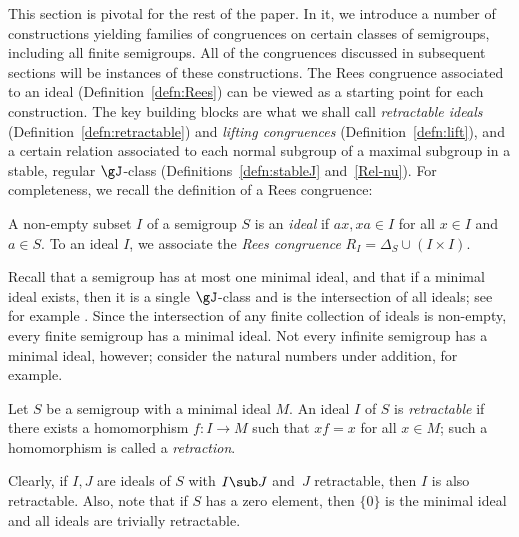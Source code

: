 This section is pivotal for the rest of the paper.  In it, we introduce a number of constructions yielding families of congruences on certain classes of semigroups, including all finite semigroups.
%
All of the congruences discussed in subsequent sections will be instances of these constructions.  The Rees congruence associated to an ideal (Definition~\ref{defn:Rees}) can be viewed as a starting point for each construction.  The key building blocks are what we shall call \emph{retractable ideals} (Definition~\ref{defn:retractable}) and \emph{lifting congruences} (Definition~\ref{defn:lift}), and a certain relation associated to each normal subgroup of a maximal subgroup in a stable, regular $\gJ$-class (Definitions~\ref{defn:stableJ} and~\ref{Rel-nu}).
%
%
For completeness, we recall the definition of a Rees congruence:

\begin{definition}\label{defn:Rees}
A non-empty subset $I$ of a semigroup $S$ is an \emph{ideal} if $ax,xa\in I$ for all $x\in I$ and $a\in S$.  To an ideal $I$, we associate the \emph{Rees congruence} $R_I=\Delta_S\cup(I\times I)$.
\end{definition}

Recall that a semigroup has at most one minimal ideal, and that if a minimal ideal exists, then it is a single $\gJ$-class and is the intersection of all ideals; see for example \cite[Section 3.1]{Howie}.  Since the intersection of any finite collection of ideals is non-empty, every finite semigroup has a minimal ideal.  Not every infinite semigroup has a minimal ideal, however; consider the natural numbers under addition, for example.

\begin{definition}\label{defn:retractable}
  Let $S$ be a semigroup with a minimal ideal $M$.  An ideal $I$ of $S$ is \textit{retractable} if there exists a
  homomorphism $f: I \to M$ such that $xf = x$ for all $x\in M$; such a
  homomorphism is called a \textit{retraction}.
\end{definition}

Clearly, if $I,J$ are ideals of $S$ with $I\sub J$ and~$J$ retractable, then $I$ is also retractable.  Also, note that if $S$ has a zero element, then $\{0\}$ is the minimal ideal and all ideals are trivially retractable.

